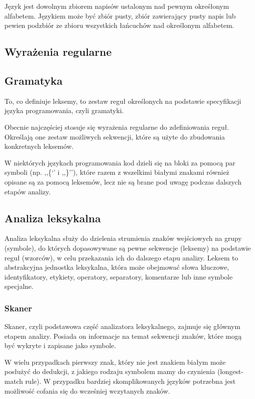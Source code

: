 \documentclass[a4paper,12pt]{article}
\begin{document}
Język jest dowolnym zbiorem napisów ustalonym nad pewnym okreśłonym alfabetem. Językiem może być zbiór pusty, zbiór zawierający pusty napis lub pewien podzbiór ze zbioru wszystkich łańcuchów nad określonym alfabetem.

\subsection{Wyrażenia regularne}

\subsection{Gramatyka}

To, co definiuje leksemy, to zestaw reguł określonych na podstawie specyfikacji języka programowania, czyli gramatyki.

Obecnie najczęściej stosuje się wyrażenia regularne do zdefiniowania reguł. Określają one zestaw możliwych sekwencji, które są użyte do zbudowania konkretnych leksemów.

W niektórych językach programowania kod dzieli się na bloki za pomocą par symboli (np. ,,\{‘’ i ,,\}’’), które razem z wszelkimi białymi znakami również opisane są za pomocą leksemów, lecz nie są brane pod uwagę podczas dalszych etapów analizy.

\subsection{Analiza leksykalna}

Analiza leksykalna służy do dzielenia strumienia znaków wejściowych na grupy (symbole), do których dopasowywane są pewne sekwencje (leksemy) na podstawie reguł (wzorców), w celu przekazania ich do dalszego etapu analizy. Leksem to abstrakcyjna jednostka leksykalna, która może obejmować słowa kluczowe, identyfikatory, etykiety, operatory, separatory, komentarze lub inne symbole specjalne.

\subsubsection{Skaner}

Skaner, czyli podstawowa część analizatora leksykalnego, zajmuje się głównym etapem analizy. Posiada on informacje na temat sekwencji znaków, które mogą być wykryte i zapisane jako symbole.

W wielu przypadkach pierwszy znak, który nie jest znakiem białym może posłużyć do dedukcji, z jakiego rodzaju symbolem mamy do czynienia (longest-match rule). W przypadku bardziej skomplikowanych języków potrzebna jest możliwość cofania się do wcześniej wczytanych znaków.
\end{document}
